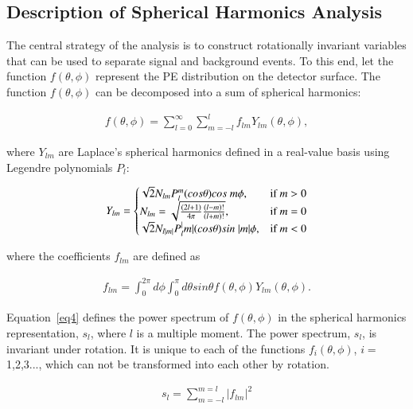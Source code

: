 \subsection{Description of Spherical Harmonics Analysis}

The central strategy of the analysis is to construct rotationally invariant variables that can be used to separate signal and background events. To this end, let the  function $f(\theta,\phi)$ represent the PE distribution on the detector surface. The function $f(\theta,\phi)$ can be decomposed into a sum of spherical harmonics:

\begin{eqnarray}
\label{eq1}
f(\theta,\phi) = \sum_{l=0}^{\infty} \sum_{m=-l}^{l} f_{lm} Y_{lm}(\theta,\phi),
\end{eqnarray}

where $Y_{lm}$ are Laplace's spherical harmonics defined in a real-value basis using Legendre polynomials $P_l$:

\begin{eqnarray}
\label{eq2}
Y_{lm} = \left\{
  \begin{array}{@{}ll@{}}
    \sqrt{2}N_{lm}P_l^m(cos\theta)cos~m\phi, & \text{if}\ m>0 \\
    N_{lm} = \sqrt{\frac{(2l+1)}{4\pi} \frac{(l-m)!}{(l+m)!}}, & \text{if}\ m=0 \\
    \sqrt{2}N_{l|m|}P_l^|m|(cos\theta)sin~|m|\phi, & \text{if}\ m<0
  \end{array}\right.
\end{eqnarray}

where the coefficients $f_{lm}$ are defined as
 
\begin{eqnarray}
\label{eq3}
f_{lm} = \int_{0}^{2\pi} d\phi \int_0^{\pi} d\theta sin\theta f(\theta,\phi) Y_{lm}(\theta,\phi).
\end{eqnarray}

Equation~\ref{eq4} defines the power spectrum of $f(\theta,\phi)$ in the spherical harmonics representation, $s_l$, where $l$ is a multiple moment. The power spectrum, $s_l$, is invariant under rotation. It is unique to each of the functions $f_i(\theta,\phi)$, $i=$1,2,3..., which can not be transformed into each other by rotation.

\begin{eqnarray}
\label{eq4}
s_l = \sum_{m=-l}^{m=l} |f_{lm}|^2
\end{eqnarray}


